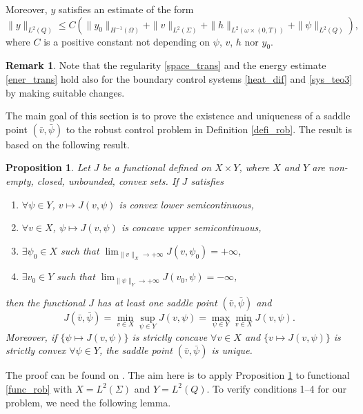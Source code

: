 \documentclass{aims}
\newtheorem{proposition}{Proposition}
\theoremstyle{definition}
\newtheorem{remark}{Remark}
\begin{document}
Moreover, $y$ satisfies an estimate of the form
%
\begin{equation}\label{ener_trans}
\|y\|_{L^2(Q)}\leq C\left(\|y_0\|_{H^{-1}(\Omega)}+\|v\|_{L^2(\Sigma)}+\|h\|_{L^2(\omega\times(0,T))}+\|\psi\|_{L^2(Q)}\right),
\end{equation}
%
where $C$ is a positive constant not depending on $\psi$, $v$, $h$ nor $y_0$. 

\begin{remark}
Note that the regularity \eqref{space_trans} and the energy estimate \eqref{ener_trans} hold also for the boundary control systems \eqref{heat_dif} and \eqref{sys_teo3} by making suitable changes. 
\end{remark}

The main goal of this section is to prove the existence and uniqueness of a saddle point $(\bar v,\bar\psi)$ to the robust control problem in Definition \ref{defi_rob}. The result is based on the following result. 
%
\begin{proposition}\label{prop_saddle}
Let $J$ be a functional defined on $X\times Y$, where $X$ and $Y$ are non-empty, closed, unbounded, convex sets. If $J$ satisfies
%
\begin{enumerate}
\item $\forall \psi\in Y$, $v\mapsto J(v,\psi)$ is convex lower semicontinuous,
\item $\forall v\in X$, $\psi\mapsto J(v,\psi)$ is concave upper semicontinuous,
\item $\exists \psi_0\in X$ such that $\lim_{\|v\|_{X}\to+\infty}J(v,\psi_0)=+\infty$, 
\item $\exists v_0\in Y$ such that $\lim_{\|\psi\|_Y\to+\infty}J(v_0,\psi)=-\infty$,
\end{enumerate}
%
then the functional $J$ has at least one saddle point $(\bar v,\bar \psi)$ and
%
\begin{equation*}
J(\bar v,\bar \psi)=\min_{v\in X}\sup_{\psi\in Y} J(v,\psi)=\max_{\psi\in Y}\min_{v\in X}J(v,\psi).
\end{equation*}
%
Moreover, if $\{\psi\mapsto J(v,\psi)\}$ is strictly concave $\forall v\in X$ and $\{v\mapsto J(v,\psi)\}$ is strictly convex $\forall \psi\in Y$, the saddle point $(\bar v,\bar \psi)$ is unique. 
\end{proposition}

 The proof can be found on \cite[Prop. 1.5 and 2.2, Ch. VI]{Ekeland}. The aim here is to apply Proposition \ref{prop_saddle} to functional \eqref{func_rob} with $X=L^2(\Sigma)$ and $Y=L^2(Q)$. To verify conditions 1--4 for our problem, we need the following lemma.
\end{document}
